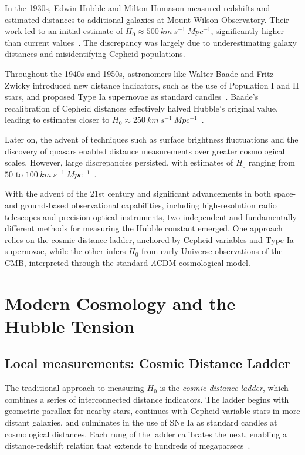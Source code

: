 In the 1930s, Edwin Hubble and Milton Humason measured redshifts and estimated distances to additional galaxies at Mount Wilson Observatory. Their work led to an initial estimate of $H_0 \approx 500~km~s^{-1}~Mpc^{-1}$, significantly higher than current values~\citep{hubble1936realm}. The discrepancy was largely due to underestimating galaxy distances and misidentifying Cepheid populations.

Throughout the 1940s and 1950s, astronomers like Walter Baade and Fritz Zwicky introduced new distance indicators, such as the use of Population I and II stars, and proposed Type Ia supernovae as standard candles~\citep{zwicky1942frequency,Baade1952,Baade1944}. Baade's recalibration of Cepheid distances effectively halved Hubble's original value, leading to estimates closer to $H_0 \approx 250~km~s^{-1}~Mpc^{-1}$~\citep{Baade1952,Longair_2006}.

Later on, the advent of techniques such as surface brightness fluctuations and the discovery of quasars enabled distance measurements over greater cosmological scales. However, large discrepancies persisted, with estimates of $H_0$ ranging from $50$ to $100~km~s^{-1}~Mpc^{-1}$~\citep{sandage1958current,de1972velocity,sandage1982steps,de1985tycho}.

With the advent of the 21st century and significant advancements in both space- and ground-based observational capabilities, including high-resolution radio telescopes and precision optical instruments, two independent and fundamentally different methods for measuring the Hubble constant emerged. One approach relies on the cosmic distance ladder, anchored by Cepheid variables and Type Ia supernovae, while the other infers $H_0$ from early-Universe observations of the \ac{CMB}, interpreted through the standard $\Lambda$CDM cosmological model.

\section{Modern Cosmology and the Hubble Tension}
\subsection{Local measurements: Cosmic Distance Ladder}
The traditional approach to measuring $H_0$ is the \textit{cosmic distance ladder}, which combines a series of interconnected distance indicators. The ladder begins with geometric parallax for nearby stars, continues with Cepheid variable stars in more distant galaxies, and culminates in the use of \ac{SNe Ia} as standard candles at cosmological distances. Each rung of the ladder calibrates the next, enabling a distance-redshift relation that extends to hundreds of megaparsecs~\citep{freedman2001final,cosmicdistanceladder,Riess:2019cxk,riess2022comprehensive}.

